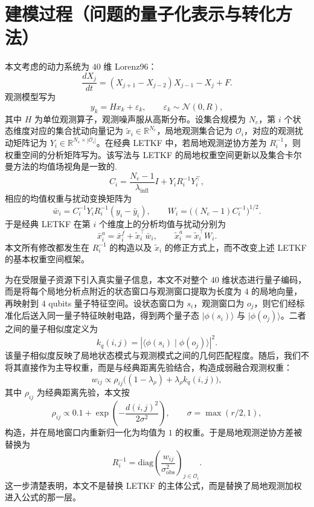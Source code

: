 \section{建模过程（问题的量子化表示与转化方法）}
本文考虑的动力系统为 $40$ 维 Lorenz96：
\begin{equation}
\frac{dX_j}{dt} = (X_{j+1}-X_{j-2})X_{j-1} - X_j + F.
\end{equation}
观测模型写为
\begin{equation}
y_k = Hx_k + \varepsilon_k, \qquad \varepsilon_k \sim \mathcal{N}(0, R),
\end{equation}
其中 $H$ 为单位观测算子，观测噪声服从高斯分布。设集合规模为 $N_e$，第 $i$ 个状态维度对应的集合扰动向量记为 $\tilde{x}_i\in \mathbb{R}^{N_e}$，局地观测集合记为 $\mathcal{O}_i$，对应的观测扰动矩阵记为 $Y_i\in\mathbb{R}^{N_e\times |\mathcal{O}_i|}$。在经典 LETKF 中，若局地观测逆协方差为 $R_i^{-1}$，则权重空间的分析矩阵写为。该写法与 LETKF 的局地权重空间更新以及集合卡尔曼方法的均值场视角是一致的\cite{hunt2007letkf,calvello2025enkf}.
\begin{equation}
C_i=\frac{N_e-1}{\lambda_{\mathrm{infl}}}I + Y_i R_i^{-1}Y_i^\top ,
\end{equation}
相应的均值权重与扰动变换矩阵为
\begin{equation}
\bar{w}_i=C_i^{-1}Y_iR_i^{-1}(y_i-\bar{y}_i),\qquad
W_i=\big((N_e-1)C_i^{-1}\big)^{1/2}.
\end{equation}
于是经典 LETKF 在第 $i$ 个维度上的分析均值与扰动分别为
\begin{equation}
\bar{x}^{a}_i=\bar{x}^{f}_i+\tilde{x}_i^\top \bar{w}_i,\qquad
\tilde{x}^{a}_i=\tilde{x}_i^\top W_i.
\end{equation}
本文所有修改都发生在 $R_i^{-1}$ 的构造以及 $\tilde{x}_i$ 的修正方式上，而不改变上述 LETKF 的基本权重空间框架。

为在受限量子资源下引入真实量子信息，本文不对整个 $40$ 维状态进行量子编码，而是将每个局地分析点附近的状态窗口与观测窗口提取为长度为 $4$ 的局地向量，再映射到 $4$ qubits 量子特征空间。设状态窗口为 $s_i$，观测窗口为 $o_j$，则它们经标准化后送入同一量子特征映射电路，得到两个量子态 $\lvert \phi(s_i)\rangle$ 与 $\lvert \phi(o_j)\rangle$。二者之间的量子相似度定义为
\begin{equation}
k_q(i,j)=|\langle \phi(s_i)\mid \phi(o_j)\rangle|^2 .
\end{equation}
该量子相似度反映了局地状态模式与观测模式之间的几何匹配程度。随后，我们不将其直接作为主导权重，而是与经典距离先验结合，构造成弱融合观测权重：
\begin{equation}
w_{ij}\propto \rho_{ij}\big((1-\lambda_\rho)+\lambda_\rho k_q(i,j)\big),
\end{equation}
其中 $\rho_{ij}$ 为经典距离先验，本文按
\begin{equation}
\rho_{ij}\propto 0.1+\exp\!\left(-\frac{d(i,j)^2}{2\sigma^2}\right),\qquad \sigma=\max(r/2,1),
\end{equation}
构造，并在局地窗口内重新归一化为均值为 $1$ 的权重。于是局地观测逆协方差被替换为
\begin{equation}
R_i^{-1}=\mathrm{diag}\!\left(\frac{w_{ij}}{\sigma_{\mathrm{obs}}^2}\right)_{j\in\mathcal{O}_i}.
\end{equation}
这一步清楚表明，本文不是替换 LETKF 的主体公式，而是替换了局地观测加权进入公式的那一层。

